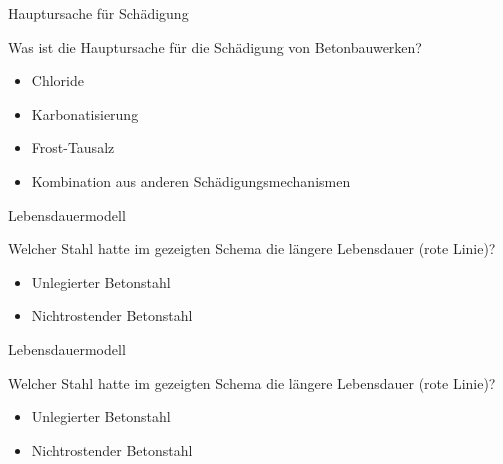 \begin{frame}{Hauptursache für Schädigung}
    \begin{Fragenblock}
        Was ist die Hauptursache für die Schädigung von Betonbauwerken?
        
        \begin{itemize}
            \item[\textcolor{green!70!black}{\faCheckSquare}] Chloride
            \item[\faSquare] Karbonatisierung
            \item[\faSquare] Frost-Tausalz
            \item[\faSquare] Kombination aus anderen Schädigungsmechanismen
        \end{itemize}
        
    \end{Fragenblock}
\end{frame}

\begin{frame}{Lebensdauermodell}
    \begin{Fragenblock}
        Welcher Stahl hatte im gezeigten Schema die längere Lebensdauer (rote Linie)?
        
        \begin{itemize}
            \item[\faSquare] Unlegierter Betonstahl
            \item[\faSquare] Nichtrostender Betonstahl
        \end{itemize}
        
    \end{Fragenblock}
\end{frame}
    
\begin{frame}{Lebensdauermodell}
    \begin{Fragenblock}
        Welcher Stahl hatte im gezeigten Schema die längere Lebensdauer (rote Linie)?
        
        \begin{itemize}
            \item[\faSquare] Unlegierter Betonstahl
            \item[\textcolor{green!70!black}{\faCheckSquare}] Nichtrostender Betonstahl
        \end{itemize}
        
    \end{Fragenblock}
\end{frame}

